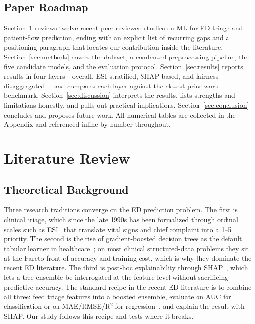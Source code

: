 \documentclass[conference]{IEEEtran}
\begin{document}
\subsection{Paper Roadmap}
Section~\ref{sec:lit} reviews twelve recent peer-reviewed studies on ML for
ED triage and patient-flow prediction, ending with an explicit list of
recurring gaps and a positioning paragraph that locates our contribution
inside the literature. Section~\ref{sec:methods} covers the dataset, a
condensed preprocessing pipeline, the five candidate models, and the
evaluation protocol. Section~\ref{sec:results} reports results in four
layers---overall, ESI-stratified, SHAP-based, and fairness-disaggregated---
and compares each layer against the closest prior-work benchmark.
Section~\ref{sec:discussion} interprets the results, lists strengths and
limitations honestly, and pulls out practical implications.
Section~\ref{sec:conclusion} concludes and proposes future work. All
numerical tables are collected in the Appendix and referenced inline by
number throughout.

\section{Literature Review}\label{sec:lit}

\subsection{Theoretical Background}
Three research traditions converge on the ED prediction problem. The first
is clinical triage, which since the late 1990s has been formalized through
ordinal scales such as ESI~\cite{gilboy2012} that translate vital signs and
chief complaint into a 1--5 priority. The second is the rise of
gradient-boosted decision trees as the default tabular learner in
healthcare~\cite{chen2016xgboost, ke2017lightgbm, breiman2001}; on most
clinical structured-data problems they sit at the Pareto front of accuracy
and training cost, which is why they dominate the recent ED literature. The
third is post-hoc explainability through SHAP~\cite{shap, lundberg2018},
which lets a tree ensemble be interrogated at the feature level without
sacrificing predictive accuracy. The standard recipe in the recent ED
literature is to combine all three: feed triage features into a boosted
ensemble, evaluate on AUC for classification or on MAE/RMSE/R$^2$ for
regression~\cite{wu2025, vural2025}, and explain the result with SHAP. Our
study follows this recipe and tests where it breaks.
\end{document}
